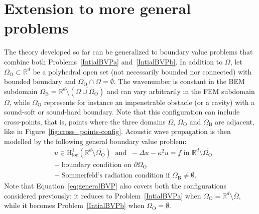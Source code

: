\documentclass[a4paper,11pt]{article}
\newcommand{\RR}{\mathbb{R}}
\newcommand{\mH}{\mathrm{H}}
\begin{document}
\section{Extension to more general problems}\label{sec:general_problems}

The theory developed so far can be generalized to boundary value problems that combine both Problems~\eqref{IntialBVPa} and~\eqref{IntialBVPb}. In addition to $\Omega$, let $\Omega_{\text{O}} \subset \RR^d$ be a polyhedral open set (not necessarily bounded nor connected) with bounded boundary and $\Omega_{\text{O}} \cap \Omega = \emptyset$. The wavenumber is constant in the BEM subdomain $\Omega_{\text{B}} = \RR^d \setminus (\overline{\Omega \cup \Omega_{\text{O}}})$ and can vary arbitrarily in the FEM subdomain $\Omega$, while $\Omega_{\text{O}}$ represents for instance an impenetrable obstacle (or a cavity) with a sound-soft or sound-hard boundary. Note that this configuration can include cross-points, that is, points where the three domains $\Omega$, $\Omega_{\text{O}}$ and $\Omega_{\text{B}}$ are adjacent, like in Figure~\ref{fig:cross_points-config}. Acoustic wave propagation is then modelled by the following general boundary value problem: 
\begin{equation}\label{eq:generalBVP}
  \begin{aligned}
    &u\in \mH^{1}_{\text{loc}}(\RR^d\setminus \overline{\Omega_{\text{O}}})\;\;\text{and}\;\; -\Delta u-\kappa^{2}u = f \text{ in }\RR^d\setminus \overline{\Omega_{\text{O}}}\\
    &+\;\text{boundary condition on } \partial\Omega_{\text{O}}\\
    &+\;\text{Sommerfeld's radiation condition if } \Omega_{\text{B}} \ne \emptyset.
  \end{aligned}
\end{equation}
Note that Equation~\eqref{eq:generalBVP} also covers both the configurations considered previously: it reduces to Problem~\eqref{IntialBVPa} when $\Omega_{\text{O}} = \RR^d \setminus \overline{\Omega}$, while it becomes Problem~\eqref{IntialBVPb} when $\Omega_{\text{O}} = \emptyset$. 
\end{document}
